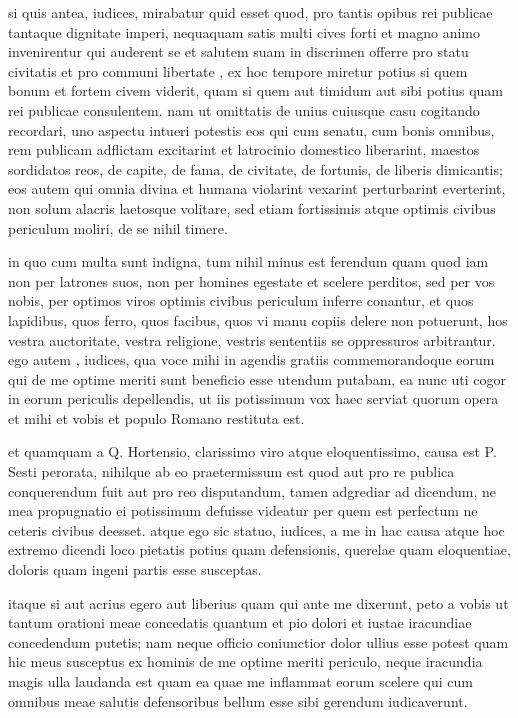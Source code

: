 
 si quis antea, iudices, mirabatur quid esset quod, pro tantis opibus rei publicae tantaque dignitate imperi, nequaquam satis multi cives forti et magno animo invenirentur qui auderent se et salutem suam in discrimen offerre pro statu civitatis et pro communi libertate , ex hoc tempore miretur potius si quem bonum et fortem civem viderit, quam si quem aut timidum aut sibi potius quam rei publicae consulentem. nam ut omittatis de unius cuiusque casu cogitando recordari, uno aspectu intueri potestis eos qui cum senatu, cum bonis omnibus, rem publicam adflictam excitarint et latrocinio domestico liberarint, maestos sordidatos reos, de capite, de fama, de civitate, de fortunis, de liberis dimicantis; eos autem qui omnia divina et humana violarint vexarint perturbarint everterint, non solum alacris laetosque volitare, sed etiam fortissimis atque optimis civibus periculum moliri, de se nihil timere.

 in quo cum multa sunt indigna, tum nihil minus est ferendum quam quod iam non per latrones suos, non per homines egestate et scelere perditos, sed per vos nobis, per optimos viros optimis civibus periculum inferre conantur, et quos lapidibus, quos ferro, quos facibus, quos vi manu copiis delere non potuerunt, hos vestra auctoritate, vestra religione, vestris sententiis se oppressuros arbitrantur. ego autem , iudices, qua voce mihi in agendis gratiis commemorandoque eorum qui de me optime meriti sunt beneficio esse utendum putabam, ea nunc uti cogor in eorum periculis depellendis, ut iis potissimum vox haec serviat quorum opera et mihi et vobis et populo Romano restituta est.

 et quamquam a Q. Hortensio, clarissimo viro atque eloquentissimo, causa est P. Sesti perorata, nihilque ab eo praetermissum est quod aut pro re publica conquerendum fuit aut pro reo disputandum, tamen adgrediar ad dicendum, ne mea propugnatio ei potissimum defuisse videatur per quem est perfectum ne ceteris civibus deesset. atque ego sic statuo, iudices, a me in hac causa atque hoc extremo dicendi loco pietatis potius quam defensionis, querelae quam eloquentiae, doloris quam ingeni partis esse susceptas.

 itaque si aut acrius egero aut liberius quam qui ante me dixerunt, peto a vobis ut tantum orationi meae concedatis quantum et pio dolori et iustae iracundiae concedendum putetis; nam neque officio coniunctior dolor ullius esse potest quam hic meus susceptus ex hominis de me optime meriti periculo, neque iracundia magis ulla laudanda est quam ea quae me inflammat eorum scelere qui cum omnibus meae salutis defensoribus bellum esse sibi gerendum iudicaverunt.

